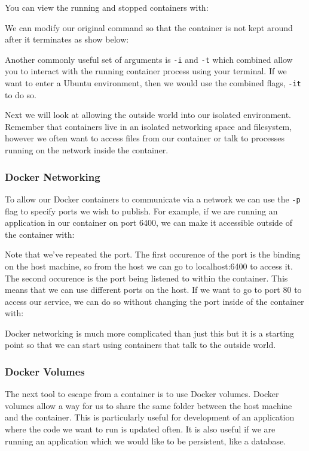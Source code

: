 \documentclass{csse4400}
\begin{document}
You can view the running and stopped containers with:

We can modify our original command so that the container is not kept around after it terminates as show below:

Another commonly useful set of arguments is \texttt{-i} and \texttt{-t} which combined allow you to interact with the running container process using your terminal.
If we want to enter a Ubuntu environment,
then we would use the combined flags, \texttt{-it} to do so.

Next we will look at allowing the outside world into our isolated environment.
Remember that containers live in an isolated networking space and filesystem,
however we often want to access files from our container or talk to processes running on the network inside the container.

\subsubsection{Docker Networking}

To allow our Docker containers to communicate via a network we can use the \texttt{-p} flag to specify ports we wish to publish.
For example, if we are running an application in our container on port 6400,
we can make it accessible outside of the container with:

Note that we've repeated the port.
The first occurence of the port is the binding on the host machine,
so from the host we can go to localhost:6400 to access it.
The second occurence is the port being listened to within the container.
This means that we can use different ports on the host.
If we want to go to port 80 to access our service,
we can do so without changing the port inside of the container with:

Docker networking is much more complicated than just this but it is a starting point so that we can start using containers that talk to the outside world.

\subsubsection{Docker Volumes}

The next tool to escape from a container is to use Docker volumes.
Docker volumes allow a way for us to share the same folder between the host machine and the container.
This is particularly useful for development of an application where the code we want to run is updated often.
It is also useful if we are running an application which we would like to be persistent, like a database.
\end{document}
